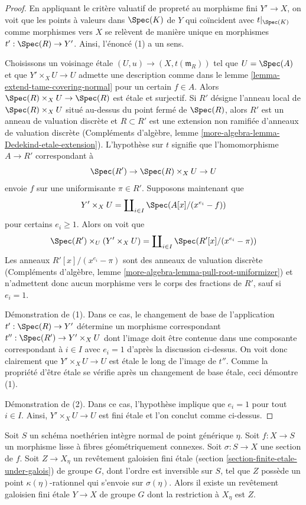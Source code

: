 \begin{proof}
En appliquant le critère valuatif de propreté au
morphisme fini $Y' \to X$, on voit que les points à valeurs dans $\Spec(K)$
de $Y$ qui coïncident avec $t|_{\Spec(K)}$ comme morphismes vers $X$
se relèvent de manière unique en morphismes $t' : \Spec(R) \to Y'$.
Ainsi, l'énoncé (1) a un sens.

\medskip\noindent
Choisissons un voisinage \'etale $(U, u) \to (X, t(\mathfrak m_R))$
tel que $U = \Spec(A)$ et que $Y' \times_X U \to U$
admette une description comme dans le lemme \ref{lemma-extend-tame-covering-normal}
pour un certain $f \in A$. Alors $\Spec(R) \times_X U \to \Spec(R)$ est \'etale
et surjectif. Si $R'$ désigne l'anneau local de
$\Spec(R) \times_X U$ situé au-dessus du point fermé de $\Spec(R)$,
alors $R'$ est un anneau de valuation discrète et $R \subset R'$
est une extension non ramifiée d'anneaux de valuation discrète
(Compléments d'algèbre, lemme \ref{more-algebra-lemma-Dedekind-etale-extension}).
L'hypothèse sur $t$ signifie que l'homomorphisme $A \to R'$
correspondant à
$$
\Spec(R') \to \Spec(R) \times_X U \to U
$$
envoie $f$ sur une uniformisante $\pi \in R'$. Supposons maintenant que
$$
Y' \times_X U =
\coprod\nolimits_{i \in I} \Spec(A[x]/(x^{e_i} - f))
$$
pour certains $e_i \geq 1$. Alors on voit que
$$
\Spec(R') \times_U (Y' \times_X U) =
\coprod\nolimits_{i \in I} \Spec(R'[x]/(x^{e_i} - \pi))
$$
Les anneaux $R'[x]/(x^{e_i} - \pi)$ sont des anneaux de valuation discrète
(Compléments d'algèbre, lemme \ref{more-algebra-lemma-pull-root-uniformizer})
et n'admettent donc aucun morphisme vers le corps des fractions de $R'$, sauf si $e_i = 1$.

\medskip\noindent
Démonstration de (1). Dans ce cas, le changement de base de l'application $t' : \Spec(R) \to Y'$
détermine un morphisme correspondant $t'' : \Spec(R') \to Y' \times_X U$
dont l'image doit être contenue dans une composante correspondant à $i \in I$ avec $e_i = 1$
d'après la discussion ci-dessus. On voit donc clairement que $Y' \times_X U \to U$
est \'etale le long de l'image de $t''$. Comme la propriété d'être \'etale
se vérifie après un changement de base \'etale, ceci démontre (1).

\medskip\noindent
Démonstration de (2). Dans ce cas, l'hypothèse implique que $e_i = 1$
pour tout $i \in I$. Ainsi, $Y' \times_X U \to U$ est fini \'etale
et l'on conclut comme ci-dessus.
\end{proof}

\begin{lemma}
\label{lemma-extend-covering}
Soit $S$ un schéma noethérien intègre normal de point générique $\eta$.
Soit $f : X \to S$ un morphisme lisse à fibres géométriquement connexes.
Soit $\sigma : S \to X$ une section de $f$. Soit $Z \to X_\eta$ un
revêtement galoisien fini \'etale (section \ref{section-finite-etale-under-galois})
de groupe $G$, dont l'ordre est inversible sur $S$, tel que
$Z$ possède un point $\kappa(\eta)$-rationnel qui s'envoie sur $\sigma(\eta)$.
Alors il existe un revêtement galoisien fini \'etale $Y \to X$ de groupe $G$
dont la restriction à $X_\eta$ est $Z$.
\end{lemma}

